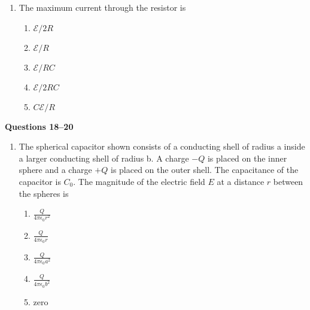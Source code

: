 \documentclass{../../../oss-apphys}
\begin{document}
\begin{multicols}{2}
\begin{enumerate}[leftmargin=18pt,resume]
  \item The maximum current through the resistor is
    \begin{enumerate}[noitemsep,topsep=0pt,leftmargin=18pt,label=(\Alph*)]
    \item $\mathcal{E}/2R$
    \item $\mathcal{E}/R$
    \item $\mathcal{E}/RC$
    \item $\mathcal{E}/2RC$
    \item $C\mathcal{E}/R$
    \end{enumerate}
  \end{enumerate}
  \columnbreak
  \textbf{Questions 18--20}
  \begin{enumerate}[leftmargin=18pt,resume]
  \item The spherical capacitor shown consists of a conducting shell of radius a
    inside a larger conducting shell of radius b. A charge $−Q$ is placed on the
    inner sphere and a charge $+Q$ is placed on the outer shell. The
    capacitance of the capacitor is $C_0$. The magnitude of the electric field
    $E$ at a distance $r$ between the spheres is
    \begin{center}
    \end{center}
    \begin{enumerate}[noitemsep,topsep=0pt,leftmargin=18pt,label=(\Alph*)]    
    \item $\displaystyle\frac{Q}{4\pi\epsilon_0r^2}$
    \item $\displaystyle\frac{Q}{4\pi\epsilon_0r}$
    \item $\displaystyle\frac{Q}{4\pi\epsilon_0a^2}$
    \item $\displaystyle\frac{Q}{4\pi\epsilon_0b^2}$
    \item zero
    \end{enumerate}


\end{enumerate}
\end{multicols}
\end{document}
